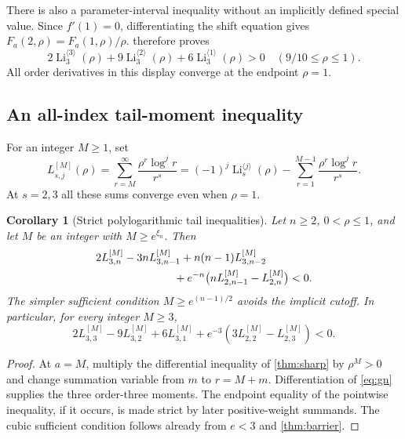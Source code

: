 \documentclass[11pt]{article}
\numberwithin{equation}{section}
\newtheorem{corollary}[corollary]{Corollary}
\theoremstyle{definition}
\newcommand{\Li}{\operatorname{Li}}
\newcommand{\ordli}[2]{\Li_{#1}^{\langle #2\rangle}}
\begin{document}
There is also a parameter-interval inequality without an implicitly defined
special value. Since $f'(1)=0$, differentiating the shift equation gives
$F_a(2,\rho)=F_a(1,\rho)/\rho$.  therefore proves
\begin{equation}\label{eq:Tpositive}
 \boxed{2\ordli{3}{3}(\rho)+9\ordli{3}{2}(\rho)+6\ordli{3}{1}(\rho)>0
 \quad(9/10\leq\rho\leq1).}
\end{equation}
All order derivatives in this display converge at the endpoint $\rho=1$.

\subsection{An all-index tail-moment inequality}
For an integer $M\geq1$, set
\begin{equation}
 L_{s,j}^{[M]}(\rho)=\sum_{r=M}^\infty\frac{\rho^r\log^jr}{r^s}
 =(-1)^j\ordli{s}{j}(\rho)-
                  \sum_{r=1}^{M-1}\frac{\rho^r\log^jr}{r^s}.
\end{equation}
At $s=2,3$ all these sums converge even when $\rho=1$.

\begin{corollary}[Strict polylogarithmic tail inequalities]\label{cor:tailineq}
Let $n\geq2$, $0<\rho\leq1$, and let $M$ be an integer with
$M\geq e^{\xi_n}$. Then
\begin{align}\label{eq:tailineq}
 &2L_{3,n}^{[M]}-3nL_{3,n-1}^{[M]}+n(n-1)L_{3,n-2}^{[M]}\notag\\
 &\hspace{25mm}+e^{-n}\bigl(nL_{2,n-1}^{[M]}-L_{2,n}^{[M]}\bigr)<0.
\end{align}
The simpler sufficient condition $M\geq e^{(n-1)/2}$ avoids the implicit
cutoff. In particular, for every integer $M\geq3$,
\begin{equation}\label{eq:cubic-tailineq}
 2L_{3,3}^{[M]}-9L_{3,2}^{[M]}+6L_{3,1}^{[M]}
       +e^{-3}(3L_{2,2}^{[M]}-L_{2,3}^{[M]})<0.
\end{equation}
\end{corollary}
\begin{proof}
At $a=M$, multiply the differential inequality of \cref{thm:sharp} by
$\rho^M>0$ and change summation variable from $m$ to $r=M+m$.
Differentiation of \eqref{eq:gn} supplies the three order-three moments.
The endpoint equality of the pointwise inequality, if it occurs, is made
strict by later positive-weight summands. The cubic sufficient condition
follows already from $e<3$ and \cref{thm:barrier}.
\end{proof}
\end{document}
